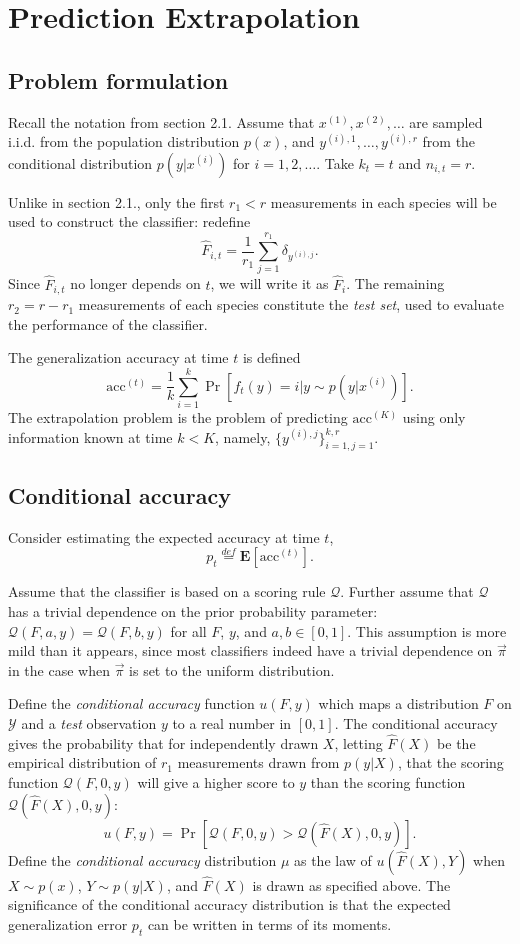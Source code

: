 \documentclass{article}
\newcommand{\E}{\textbf{E}}
\begin{document}
\section{Prediction Extrapolation}

\subsection{Problem formulation}

Recall the notation from section 2.1. Assume that
$x^{(1)}, x^{(2)}, \hdots$ are sampled i.i.d. from the population distribution $p(x)$, 
and $y^{(i), 1}, \hdots, y^{(i), r}$ from the conditional
distribution $p(y|x^{(i)})$ for $i = 1, 2, \hdots$.
Take $k_t = t$ and $n_{i, t} = r$.

Unlike in section 2.1., only the first $r_1 < r$ measurements in each species will
be used to construct the classifier: redefine
\[
\hat{F}_{i, t} = \frac{1}{r_1} \sum_{j=1}^{r_1} \delta_{y^{(i), j}}.
\]
Since $\hat{F}_{i, t}$ no longer depends on $t$, we will write it as $\hat{F}_i$.
The remaining $r_2 = r - r_1$ measurements of each species constitute the \emph{test set},
used to evaluate the performance of the classifier.

The generalization accuracy at time $t$ is defined
\[
\text{acc}^{(t)} = \frac{1}{k}\sum_{i=1}^k \Pr[f_t(y) = i|y \sim p(y|x^{(i)})].
\]
The extrapolation problem is the problem of predicting $\text{acc}^{(K)}$ using
only information known at time $k < K$, namely,
$\{y^{(i), j}\}_{i=1, j=1}^{k, r}$.

\subsection{Conditional accuracy}

Consider estimating the expected accuracy at time $t$, \[p_t \stackrel{def}{=} \E[\text{acc}^{(t)}].\]

Assume that the classifier is based on a scoring rule $\mathcal{Q}$.
Further assume that $\mathcal{Q}$ has a trivial dependence on the prior probability parameter: 
$\mathcal{Q}(F, a, y) = \mathcal{Q}(F, b, y)$ for all $F$, $y$, and $a, b \in [0, 1]$.
This assumption is more mild than it appears, since most classifiers indeed have a trivial dependence on $\vec{\pi}$
in the case when $\vec{\pi}$ is set to the uniform distribution.

Define the \emph{conditional accuracy} function $u(F, y)$ which
maps a distribution $F$ on $\mathcal{Y}$ and a \emph{test} observation $y$ to a real number in $[0,1]$.
The conditional accuracy gives the probability that for independently
drawn $X$, letting $\hat{F}(X)$ be the empirical distribution of $r_1$ measurements drawn from $p(y|X)$,
that the scoring function $\mathcal{Q}(F, 0, y)$ will give a higher score to $y$ than
the scoring function $\mathcal{Q}(\hat{F}(X), 0, y)$:
\[
u(F, y) = \Pr[\mathcal{Q}(F, 0, y) > \mathcal{Q}(\hat{F}(X), 0, y)].
\]
Define the \emph{conditional accuracy} distribution $\mu$ as the law of
$u(\hat{F}(X), Y)$ when $X \sim p(x)$, $Y\sim p(y|X)$, and $\hat{F}(X)$ is
drawn as specified above.  The significance of the conditional
accuracy distribution is that the expected generalization error $p_t$
can be written in terms of its moments.
\end{document}
